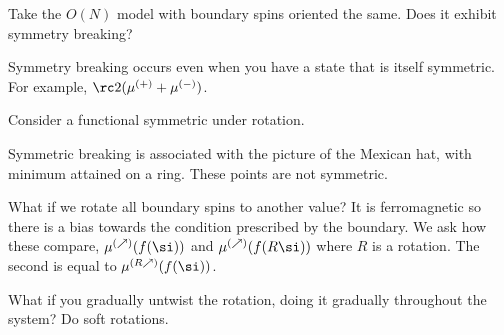 Take the $O(N)$ model with boundary spins oriented the same. Does it exhibit symmetry breaking? %

Symmetry breaking occurs even when you have a state that is itself symmetric. For example, $\rc2 (\mu^{(+)} + \mu^{(-)})$. 

Consider a functional symmetric under rotation. 

Symmetric breaking is associated with the picture of the Mexican hat, with minimum attained on a ring. These points are not symmetric. 


What if we rotate all boundary spins to another value? It is ferromagnetic so there is a bias towards the condition prescribed by the boundary. %
We ask how these compare, $\mu^{(\nearrow)} (f(\si))$ and $\mu^{(\nearrow)} (f(R\si))$ where $R$ is a rotation. The second is equal to $\mu^{(R\nearrow)}(f(\si))$. 

What if you gradually untwist the rotation, doing it gradually throughout the system? Do soft rotations.